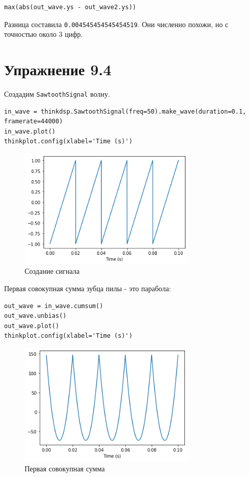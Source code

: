 \documentclass[a4paper,12pt]{report}
\begin{document}
\begin{lstlisting}[caption=Разница между реализациями]
max(abs(out_wave.ys - out_wave2.ys))
\end{lstlisting}

Разница составила \texttt{0.004545454545454519}. Они численно похожи, но с точностью около 3 цифр.

\chapter{Упражнение 9.4}

Создадим \texttt{SawtoothSignal} волну.

\begin{lstlisting}[caption=Создание сигнала]
in_wave = thinkdsp.SawtoothSignal(freq=50).make_wave(duration=0.1, framerate=44000)
in_wave.plot()
thinkplot.config(xlabel='Time (s)')
\end{lstlisting}

\begin{figure}[H]
        \centering
        \includegraphics[width=0.75\textwidth]{lab9_fig4_1.png}
        \caption{Создание сигнала}
        \label{fig:lab9_fig4_1}
\end{figure}

Первая совокупная сумма зубца пилы - это парабола:

\begin{lstlisting}[caption=Первая совокупная сумма]
out_wave = in_wave.cumsum()
out_wave.unbias()
out_wave.plot()
thinkplot.config(xlabel='Time (s)')
\end{lstlisting}

\begin{figure}[H]
        \centering
        \includegraphics[width=0.75\textwidth]{lab9_fig4_2.png}
        \caption{Первая совокупная сумма}
        \label{fig:lab9_fig4_2}
\end{figure}
\end{document}
